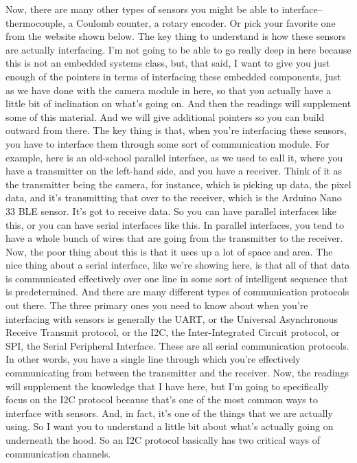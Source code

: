 Now, there are many other types of sensors you might be able to interface-- thermocouple, a Coulomb counter, a rotary encoder.
Or pick your favorite one from the website shown below.
The key thing to understand is how these sensors are actually interfacing.
I'm not going to be able to go really deep in here because this is not an embedded systems class, but, that said, I want to give you just enough of the pointers in terms of interfacing these embedded components, just as we have done with the camera module in here, so that you actually have a little bit of inclination on what's going on.
And then the readings will supplement some of this material.
And we will give additional pointers so you can build outward from there.
The key thing is that, when you're interfacing these sensors, you have to interface them through some sort of communication module.
For example, here is an old-school parallel interface, as we used to call it, where you have a transmitter on the left-hand side, and you have a receiver.
Think of it as the transmitter being the camera, for instance, which is picking up data, the pixel data, and it's transmitting that over to the receiver, which is the Arduino Nano 33 BLE sensor.
It's got to receive data.
So you can have parallel interfaces like this, or you can have serial interfaces like this.
In parallel interfaces, you tend to have a whole bunch of wires that are going from the transmitter to the receiver. 
Now, the poor thing about this is that it uses up a lot of space and area.
The nice thing about a serial interface, like we're showing here, is that all of that data is communicated effectively over one line in some sort of intelligent sequence that is predetermined.
And there are many different types of communication protocols out there.
The three primary ones you need to know about when you're interfacing with sensors is generally the UART, or the Universal Asynchronous Receive Transmit protocol, or the I2C, the Inter-Integrated Circuit protocol, or SPI, the Serial Peripheral Interface.
These are all serial communication protocols.
In other words, you have a single line through which you're effectively communicating from between the transmitter and the receiver.
Now, the readings will supplement the knowledge that I have here, but I'm going to specifically focus on the I2C protocol because that's one of the most common ways to interface with sensors.
And, in fact, it's one of the things that we are actually using.
So I want you to understand a little bit about what's actually going on underneath the hood.
So an I2C protocol basically has two critical ways of communication channels.
